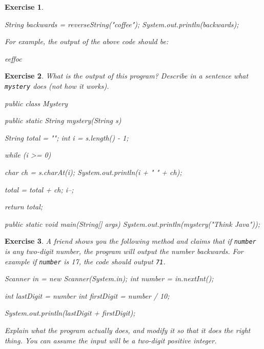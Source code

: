 \documentclass[12pt]{book}
\theoremstyle{exercise}
\newtheorem{exercise}{Exercise}[chapter]
\newcommand{\java}[1]{\verb"#1"}
\newcommand{\java}[1]{\lstinline{#1}} %
\begin{document}
\begin{exercise}
\begin{enumerate}
\begin{code}
    String backwards = reverseString("coffee");
    System.out.println(backwards);
\end{code}

For example, the output of the above code should be:

\begin{stdout}
eeffoc
\end{stdout}

\end{enumerate}

\end{exercise}


\begin{exercise}

What is the output of this program?
Describe in a sentence what \java{mystery} does (not how it works).

\begin{code}
public class Mystery {

    public static String mystery(String s) {
        String total = "";
        int i = s.length() - 1;

        while (i >= 0) {
            char ch = s.charAt(i);
            System.out.println(i + "     " + ch);

            total = total + ch;
            i--;
        }
        return total;
    }

    public static void main(String[] args) {
        System.out.println(mystery("Think Java"));
    }

}
\end{code}

\end{exercise}


\begin{exercise}

A friend shows you the following method and claims that if \java{number} is any two-digit number, the program will output the number backwards.
For example if \java{number} is 17, the code should output {\tt 71}.

\begin{code}
    Scanner in = new Scanner(System.in);
    int number = in.nextInt();

    int lastDigit = number %
    int firstDigit = number / 10;

    System.out.println(lastDigit + firstDigit);
\end{code}

Explain what the program actually does, and modify it so that it does the right thing.
You can assume the input will be a two-digit positive integer.

\end{exercise}
\end{document}
